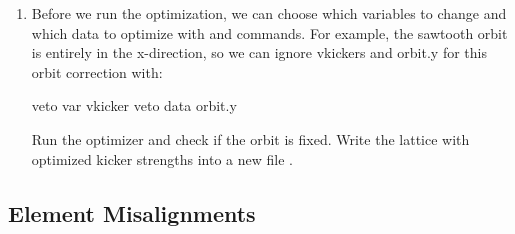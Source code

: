 \documentclass{hitec}     %
\begin{document}
{{{{\begin{enumerate}[leftmargin=*]
\begin{code}
&tao_template_graph
  graph%
  graph_index = 1
  graph%
  graph%
  graph%
  graph%
  curve(1)%
  curve(1)%
  curve(1)%
  curve(1)%
/

&tao_template_plot
  plot%
  default_graph%
  default_graph%
  plot%
  plot%
/

&tao_template_graph
  graph%
  graph_index = 1
  graph%
  graph%
  graph%
  graph%
  curve(1)%
  curve(1)%
  curve(1)%
/
\end{code}
\item Before we run the optimization, we can choose which variables to change and which data to optimize with  and  commands. For example, the sawtooth orbit is entirely in the x-direction, so we can ignore vkickers and orbit.y for this orbit correction with:
\begin{code}
veto var vkicker
veto data orbit.y
\end{code}
Run the optimizer and check if the orbit is fixed. Write the lattice with optimized kicker strengths into a new file .
\end{enumerate}

\subsection{Element Misalignments}
\label{s:ele.mis}

}}}}
\end{document}
